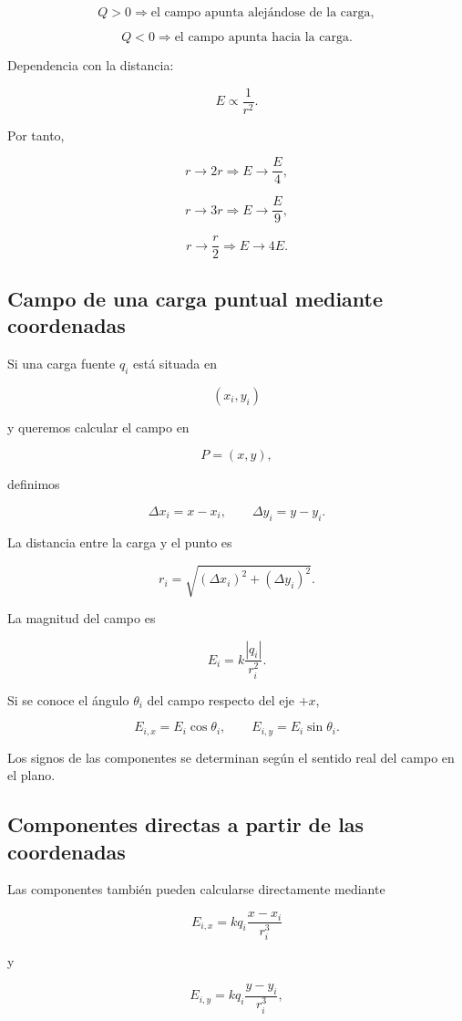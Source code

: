 \[
Q>0 \Longrightarrow \text{el campo apunta alejándose de la carga},
\]

\[
Q<0 \Longrightarrow \text{el campo apunta hacia la carga}.
\]

Dependencia con la distancia:

\[
\boxed{E\propto\frac{1}{r^2}}.
\]

Por tanto,

\[
r\to2r \Longrightarrow E\to\frac{E}{4},
\]

\[
r\to3r \Longrightarrow E\to\frac{E}{9},
\]

\[
r\to\frac{r}{2} \Longrightarrow E\to4E.
\]


\subsection{Campo de una carga puntual mediante coordenadas}

Si una carga fuente \(q_i\) está situada en

\[
(x_i,y_i)
\]

y queremos calcular el campo en

\[
P=(x,y),
\]

definimos

\[
\boxed{\Delta x_i=x-x_i}, \qquad
\boxed{\Delta y_i=y-y_i}.
\]

La distancia entre la carga y el punto es

\[
\boxed{r_i=\sqrt{(\Delta x_i)^2+(\Delta y_i)^2}}.
\]

La magnitud del campo es

\[
\boxed{E_i=k\frac{|q_i|}{r_i^2}}.
\]

Si se conoce el ángulo \(\theta_i\) del campo respecto del eje \(+x\),

\[
\boxed{E_{i,x}=E_i\cos\theta_i},
\qquad
\boxed{E_{i,y}=E_i\sin\theta_i}.
\]

Los signos de las componentes se determinan según el sentido real del campo en el plano.


\subsection{Componentes directas a partir de las coordenadas}

Las componentes también pueden calcularse directamente mediante

\[
\boxed{
E_{i,x}
=
kq_i\frac{x-x_i}{r_i^3}
}
\]

y

\[
\boxed{
E_{i,y}
=
kq_i\frac{y-y_i}{r_i^3}
},
\]

